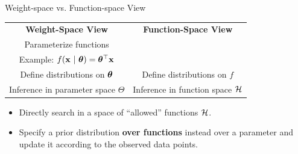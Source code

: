\documentclass[11pt,compress,t,notes=noshow, xcolor=table]{beamer}
\begin{document}
\begin{frame}{Weight-space vs. Function-space View}

\begin{table}
  \begin{tabular}{cc}
  \textbf{Weight-Space View} & \textbf{Function-Space View} \vspace{1mm}\\ 
  Parameterize functions & \\
  \footnotesize Example: $f(\mathbf{x} ~|~ \bm{\theta}) = \bm{\theta}^\top \mathbf{x}$ & \vspace{1mm}\\
  Define distributions on $\bm{\theta}$ & Define distributions on $f$ \vspace{1mm}\\
  Inference in parameter space $\Theta$ & Inference in function space $\mathcal{H}$
  \end{tabular}
\end{table}  


\begin{itemize}
  \item Directly search in a space of \enquote{allowed} functions $\mathcal{H}$.  
  \item Specify a prior distribution \textbf{over functions} instead over a parameter and update it according to the observed data points. 
\end{itemize}


\begin{center}
    
\end{center}
\end{frame}
\end{document}
